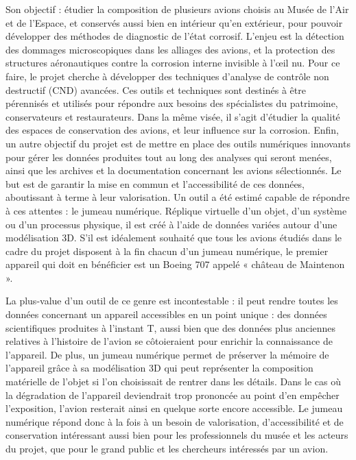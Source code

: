 \documentclass[a4paper,12pt,twoside]{book}
\begin{document}
Son objectif : étudier la composition de plusieurs avions choisis au Musée de l’Air et de l’Espace, et conservés aussi bien en intérieur qu'en extérieur, pour pouvoir développer des méthodes de diagnostic de l'état corrosif. L'enjeu est la détection des dommages microscopiques dans les alliages des avions, et la protection des structures aéronautiques contre la corrosion interne invisible à l'œil nu. Pour ce faire, le projet cherche à développer des techniques d'analyse de contrôle non destructif (CND) avancées. Ces outils et techniques sont destinés à être pérennisés et utilisés pour répondre aux besoins des spécialistes du patrimoine, conservateurs et restaurateurs. Dans la même visée, il s'agit d'étudier la qualité des espaces de conservation des avions, et leur influence sur la corrosion. Enfin, un autre objectif du projet est de mettre en place des outils numériques innovants pour gérer les données produites tout au long des analyses qui seront menées, ainsi que les archives et la documentation concernant les avions sélectionnés. Le but est de garantir la mise en commun et l'accessibilité de ces données, aboutissant à terme à leur valorisation. Un outil a été estimé capable de répondre à ces attentes : le jumeau numérique. Réplique virtuelle d'un objet, d'un système ou d'un processus physique, il est créé à l'aide de données variées autour d'une modélisation 3D. S’il est idéalement souhaité que tous les avions étudiés dans le cadre du projet disposent à la fin chacun d’un jumeau numérique, le premier appareil qui doit en bénéficier est un Boeing 707 appelé « château de Maintenon ».

La plus-value d'un outil de ce genre est incontestable : il peut rendre toutes les données concernant un appareil accessibles en un point unique : des données scientifiques produites à l’instant T, aussi bien que des données plus anciennes relatives à l’histoire de l’avion se côtoieraient pour enrichir la connaissance de l’appareil. De plus, un jumeau numérique permet de préserver la mémoire de l'appareil grâce à sa modélisation 3D qui peut représenter la composition matérielle de l’objet si l’on choisissait de rentrer dans les détails. Dans le cas où la dégradation de l'appareil deviendrait trop prononcée au point d'en empêcher l'exposition, l’avion resterait ainsi en quelque sorte encore accessible. Le jumeau numérique répond donc à la fois à un besoin de valorisation, d’accessibilité et de conservation intéressant aussi bien pour les professionnels du musée et les acteurs du projet, que pour le grand public et les chercheurs intéressés par un avion. 
\end{document}
